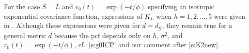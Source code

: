\documentclass[alpha-refs]{wiley-article}
\begin{document}
%
%


For the case $S=L$ and $r_0(t)=\exp(-t/\phi)$ specifying an isotropic exponential covariance function, expressions of $K_L$ when $h=1,2,\ldots,5$ were given in \citep[][Appendix A]{HeidiMe}. Although these expressions were given for $d=d_{\mathcal G}$, they remain true for a general metric $d$ because the pcf depends only on $h$, $\sigma^2$, and $r_0(t)=\exp(-t/\phi)$, cf.\ \eqref{e:g0ICP} and our comment after \eqref{e:K2new}. 
\end{document}
